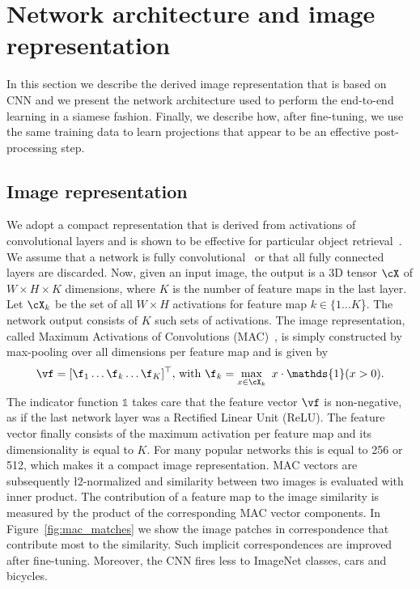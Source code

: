 \section{Network architecture and image representation}
\label{sec:network}
%
In this section we describe the derived image representation that is based on CNN and we present the network architecture used to perform the end-to-end learning in a siamese fashion.
Finally, we describe how, after fine-tuning, we use the same training data to learn projections that appear to be an effective post-processing step.

\subsection{Image representation}
\vspace{-2pt}
We adopt a compact representation that is derived from activations of convolutional layers and is shown to be effective for particular object retrieval~\cite{ARSM+14,TSJ16}.
We assume that a network is fully convolutional~\cite{PKS15} or that all fully connected layers are discarded.
Now, given an input image, the output is a 3D tensor $\cX$ of $W\times H \times K$ dimensions, where $K$ is the number of feature maps in the last layer. 
Let $\cX_k$ be the set of all $W\times H$ activations for feature map $k \in \{1 \ldots K$\}.
The network output consists of $K$ such sets of activations.
The image representation, called Maximum Activations of Convolutions (MAC)~\cite{RSMC14,TSJ16}, is simply constructed by max-pooling over all dimensions per feature map and is given by
%
\vspace{-2pt}
\begin{equation}
\vspace{-2pt}
\vf = [\f_1 \ldots \f_k \ldots \f_K]^\top \text{,~with~} \f_k = \max_{x\in \cX_{k}}~x \cdot \mathds{1}(x>0).
\label{equ:mac}
\end{equation}
%
\noindent
The indicator function $\mathds{1}$ takes care that the feature vector $\vf$ is non-negative, as if the last network layer was a Rectified Linear Unit (ReLU).
The feature vector finally consists of the maximum activation per feature map and its dimensionality  is equal to $K$.
For many popular networks this is equal to 256 or 512, which makes it a compact image representation.
MAC vectors are subsequently \l2-normalized and similarity between two images is evaluated with inner product. 
The contribution of a feature map to the image similarity is measured by the product of the corresponding MAC vector components. 
In Figure~\ref{fig:mac_matches} we show the image patches in correspondence that contribute most to the similarity. 
Such implicit correspondences are improved after fine-tuning. Moreover, the CNN fires less to ImageNet classes, \eg cars and bicycles. 
%

%
\vspace{-6pt}

